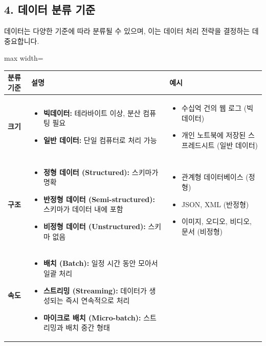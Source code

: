 \documentclass[11pt,a4paper]{article}
\theoremstyle{definition}
\begin{document}
\subsection*{4. 데이터 분류 기준}

데이터는 다양한 기준에 따라 분류될 수 있으며, 이는 데이터 처리 전략을 결정하는 데 중요합니다.

\begin{adjustbox}{max width=\textwidth}
\begin{tabular}{lll}
\toprule
\textbf{분류 기준} & \textbf{설명} & \textbf{예시} \\
\midrule
\textbf{크기} &
\begin{itemize}
    \item \textbf{빅데이터:} 테라바이트 이상, 분산 컴퓨팅 필요
    \item \textbf{일반 데이터:} 단일 컴퓨터로 처리 가능
\end{itemize} &
\begin{itemize}
    \item 수십억 건의 웹 로그 (빅데이터)
    \item 개인 노트북에 저장된 스프레드시트 (일반 데이터)
\end{itemize} \\
\textbf{구조} &
\begin{itemize}
    \item \textbf{정형 데이터 (Structured):} 스키마가 명확
    \item \textbf{반정형 데이터 (Semi-structured):} 스키마가 데이터 내에 포함
    \item \textbf{비정형 데이터 (Unstructured):} 스키마 없음
\end{itemize} &
\begin{itemize}
    \item 관계형 데이터베이스 (정형)
    \item JSON, XML (반정형)
    \item 이미지, 오디오, 비디오, 문서 (비정형)
\end{itemize} \\
\textbf{속도} &
\begin{itemize}
    \item \textbf{배치 (Batch):} 일정 시간 동안 모아서 일괄 처리
    \item \textbf{스트리밍 (Streaming):} 데이터가 생성되는 즉시 연속적으로 처리
    \item \textbf{마이크로 배치 (Micro-batch):} 스트리밍과 배치 중간 형태
\end{itemize} &
\begin{itemize}

\end{itemize}
\end{tabular}
\end{adjustbox}
\end{document}
